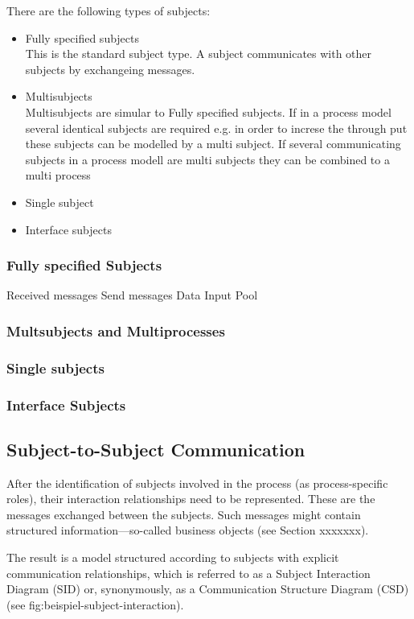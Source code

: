 There are the following types of subjects:
\begin{itemize}
	\item Fully specified subjects \\
	This is the standard subject type. A subject communicates with other subjects by exchangeing messages.
	\item Multisubjects \\
	Multisubjects are simular to Fully specified subjects. If in a process model several identical subjects are required e.g. in order to increse the through put these subjects can be modelled by a multi subject. If several communicating subjects in a process modell are multi subjects they can be combined to a multi process 
	\item Single subject
	\item Interface subjects \\
\end{itemize}


\subsubsection{Fully specified Subjects}
Received messages
Send messages
Data
Input Pool

\subsubsection{Multsubjects and Multiprocesses}

\subsubsection{Single subjects}

\subsubsection{Interface Subjects}


\subsection{Subject-to-Subject Communication}
After the identification of subjects involved in the process (as process-specific roles), their interaction relationships need to be represented. These are the messages exchanged between the subjects. Such messages might contain structured information—so-called business objects (see Section xxxxxxx).\

The result is a model structured according to subjects with explicit communication relationships, which is referred to as a Subject Interaction Diagram (SID) or, synonymously, as a Communication Structure Diagram (CSD) (see \figurename{fig:beispiel-subject-interaction}).

